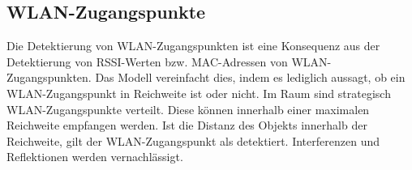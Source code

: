 \subsection{WLAN-Zugangspunkte}
Die Detektierung von WLAN-Zugangspunkten ist eine Konsequenz aus der Detektierung von RSSI-Werten bzw. MAC-Adressen von WLAN-Zugangspunkten.
Das Modell vereinfacht dies, indem es lediglich aussagt, ob ein WLAN-Zugangspunkt in Reichweite ist oder nicht.
\newline
\newline
Im Raum sind strategisch WLAN-Zugangspunkte verteilt.
Diese können innerhalb einer maximalen Reichweite empfangen werden.
Ist die Distanz des Objekts innerhalb der Reichweite, gilt der WLAN-Zugangspunkt als detektiert.
Interferenzen und Reflektionen werden vernachlässigt.